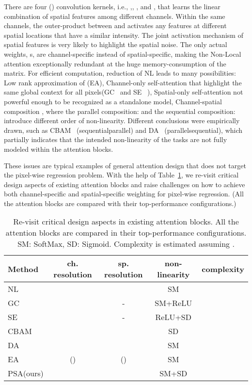 \documentclass[10pt,twocolumn,letterpaper]{article}
\begin{document}
There are four () convolution kernels, i.e.,  ,, , and , that learns the linear combination of spatial features among different channels. Within the same channels, the  outer-product between  and  activates any features at different spatial locations that have a similar intensity. The joint activation mechanism of spatial features is very likely to highlight the spatial noise. The only actual weights, s, are channel-specific instead of spatial-specific, making the Non-Local attention exceptionally redundant at the huge memory-consumption of the  matrix. 
For efficient computation, reduction of NL leads to many possibilities: Low rank approximation of  (EA), Channel-only self-attention  that highlight the same global context for all pixels(GC~\cite{Cao19} and SE~\cite{Hu18b} ), Spatial-only self-attention  not powerful enough to be recognized as a standalone model, Channel-spatial composition , where the parallel composition:  and the sequential composition:  introduce different order of non-linearity. Different conclusions were empirically drawn, such as CBAM~\cite{Sanghyun2018cbam}  (sequentialparallel) and DA~\cite{Fu2019} (parallelsequential), which partially indicates that the intended non-linearity of the tasks are not fully modeled within the attention blocks. 

These issues are typical examples of general attention design that does not target the pixel-wise regression problem. With the help of Table~\ref{table:Analysis}, we re-visit critical design aspects of existing attention blocks and raise challenges on how to achieve both channel-specific and spatial-specific weighting for pixel-wise regression. (All the attention blocks are compared with their top-performance configurations.) 

\begin{table}[!htb]
\centering
\fontsize{7}{8}\selectfont
\setlength{\tabcolsep}{1.6pt}
\begin{tabular}{l|c|c|c|c}
\hline
\textbf{Method} & ch. resolution& sp. resolution& non-linearity & complexity\hspace{0.1cm}  \\
\hline \hline
NL\cite{Wang18nonlocal} &  & & SM & \\  \hline 
GC~\cite{Cao19}   &  & - & SM+ReLU &  \\ 
SE~\cite{Hu18b}   &  & - & ReLU+SD &  \\ 
CBAM~\cite{Sanghyun2018cbam} &  &  & SD & \\ 
DA~\cite{Fu2019} &  &  & SM & \\ 
EA~\cite{Shen20} &  () &  () & SM & \\ 
\hline
PSA(ours) & &  & SM+SD & \\
\hline
\end{tabular}
\caption{Re-visit critical design aspects in existing attention blocks. All the attention blocks are compared in their top-performance configurations. SM: SoftMax, SD: Sigmoid. Complexity is estimated assuming .}
\label{table:Analysis}
\end{table}
\end{document}
